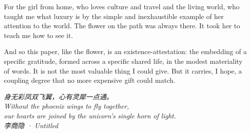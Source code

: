 \vspace{0.5em}

\noindent
{}

\vspace{0.5em}

\noindent
For the girl from home, who loves culture and travel and the living world, who taught me what luxury is by the simple and inexhaustible example of her attention to the world. The flower on the path was always there. It took her to teach me how to see it.

\vspace{0.5em}

\noindent
And so this paper, like the flower, is an existence-attestation: the embedding of a specific gratitude, formed across a specific shared life, in the modest materiality of words. It is not the most valuable thing I could give. But it carries, I hope, a coupling degree that no more expensive gift could match.

\vspace{2em}
\goldrule

\vspace{1.5em}
\begin{center}
\begin{minipage}{0.72\linewidth}
\centering\itshape\color{rose}
{\cjk 身无彩凤双飞翼，心有灵犀一点通。}\\[0.5em]
\upshape Without the phoenix wings to fly together,\\[0.2em]
our hearts are joined by the unicorn's single horn of light.\\[0.8em]
{\footnotesize\color{gold} {\cjk 李商隐} · \emph{Untitled}}
\end{minipage}
\end{center}

\vspace{1.5em}
\goldrule
